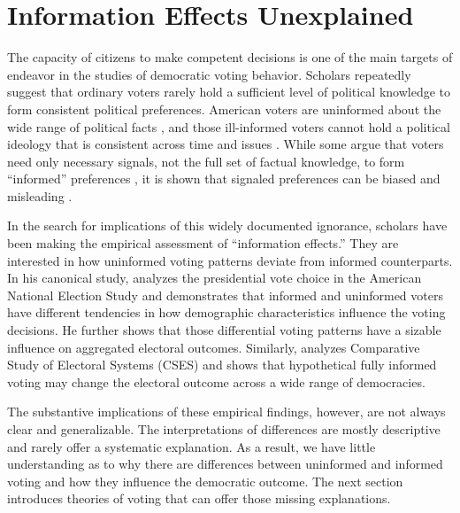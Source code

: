 \documentclass[letterpaper, 12pt]{article}
\begin{document}
    \section*{Information Effects Unexplained}
    
    \par The capacity of citizens to make competent decisions is one of the main targets of endeavor in the studies of democratic voting behavior. Scholars repeatedly suggest that ordinary voters rarely hold a sufficient level of political knowledge to form consistent political preferences. American voters are uninformed about the wide range of political facts \citep{Dellicarpini1996wham}, and those ill-informed voters cannot hold a political ideology that is consistent across time and issues \citep{Converse1964thna, Zaller1992thna, Broockman2016apto}. While some argue that voters need only necessary signals, not the full set of factual knowledge, to form ``informed'' preferences \citep[e.g.,][]{Lupia1994shve}, it is shown that signaled preferences can be biased and misleading \citep{Kuklinski2000mian, Fowler2014thpo, Boudreau2015loin}. 

    \par In the search for implications of this widely documented ignorance, 
    scholars have been making the empirical assessment of ``information effects.'' They are interested in how uninformed voting patterns deviate from informed counterparts. In his canonical study, \cite{Bartels1996unvo} analyzes the presidential vote choice in the American National Election Study and demonstrates that informed and uninformed voters have different tendencies in how demographic characteristics influence the voting decisions. He further shows that those differential voting patterns have a sizable influence on aggregated electoral outcomes. Similarly, \cite{Arnold2012thel} analyzes Comparative Study of Electoral Systems (CSES) and shows that hypothetical fully informed voting may change the electoral outcome across a wide range of democracies. 
    
    \par The substantive implications of these empirical findings, however, are not always clear and generalizable. The interpretations of differences are mostly descriptive and rarely offer a systematic explanation. As a result, we have little understanding as to why there are differences between uninformed and informed voting and how they influence the democratic outcome. The next section introduces theories of voting that can offer those missing explanations. %
    
\end{document}
